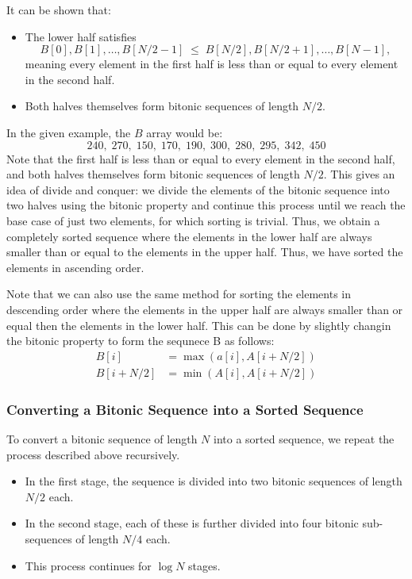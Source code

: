 \documentclass[12pt]{book}
\begin{document}
It can be shown that:
\begin{itemize}
    \item The lower half satisfies
    \[
    B[0], B[1], \ldots, B[N/2 - 1] \;\leq\; B[N/2], B[N/2+1], \ldots, B[N-1],
    \]
    meaning every element in the first half is less than or equal to every element in the second half.
    \item Both halves themselves form bitonic sequences of length $N/2$.
\end{itemize}
In the given example, the $B$ array would be:
\[
240,\;270,\;150,\;170,\;190,\;300,\;280,\;295,\;342,\;450
\]
Note that the first half is less than or equal to every element in the second half, and both halves themselves form bitonic sequences of length $N/2$. This gives an idea of divide and conquer: we divide the elements of the bitonic sequence into two halves using the bitonic property and continue this process until we reach the base case of just two elements, for which sorting is trivial. Thus, we obtain a completely sorted sequence where the elements in the lower half are always smaller than or equal to the elements in the upper half. Thus, we have sorted the elements in ascending order.

Note that we can also use the same method for sorting the elements in descending order where the elements in the upper half are always smaller than or equal then the elements in the lower half. This can be done by slightly changin the bitonic property to form the sequnece B as follows:
\begin{align*}
    B[i] &= \max (a[i],A[i+N/2])\\
    B[i+N/2] &= \min(A[i],A[i+N/2])
\end{align*}

\subsubsection{Converting a Bitonic Sequence into a Sorted Sequence}

To convert a bitonic sequence of length $N$ into a sorted sequence, we repeat the process described above recursively. 

\begin{itemize}
    \item In the first stage, the sequence is divided into two bitonic sequences of length $N/2$ each.
    \item In the second stage, each of these is further divided into four bitonic sub-sequences of length $N/4$ each.
    \item This process continues for $\log N$ stages.
\end{itemize}
\end{document}
